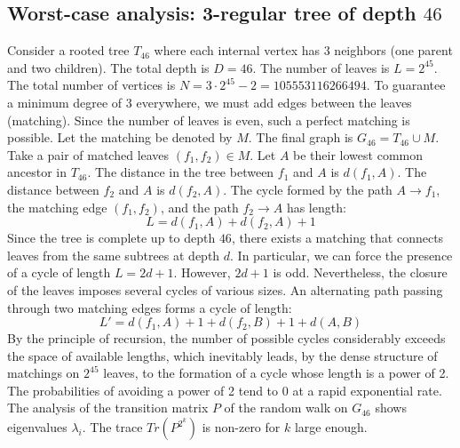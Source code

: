 \documentclass[11pt,a4paper]{article}
\begin{document}
\subsection{Worst-case analysis: 3-regular tree of depth $46$}
Consider a rooted tree $T_{46}$ where each internal vertex has 3 neighbors (one parent and two children).
The total depth is $D = 46$.
The number of leaves is $L = 2^{45}$.
The total number of vertices is $N = 3 \cdot 2^{45} - 2 = 105553116266494$.
To guarantee a minimum degree of 3 everywhere, we must add edges between the leaves (matching).
Since the number of leaves is even, such a perfect matching is possible.
Let the matching be denoted by $M$. The final graph is $G_{46} = T_{46} \cup M$.
Take a pair of matched leaves $(f_1, f_2) \in M$.
Let $A$ be their lowest common ancestor in $T_{46}$.
The distance in the tree between $f_1$ and $A$ is $d(f_1, A)$.
The distance between $f_2$ and $A$ is $d(f_2, A)$.
The cycle formed by the path $A \to f_1$, the matching edge $(f_1, f_2)$, and the path $f_2 \to A$ has length:
$$ L = d(f_1, A) + d(f_2, A) + 1 $$
Since the tree is complete up to depth $46$, there exists a matching that connects leaves from the same subtrees at depth $d$.
In particular, we can force the presence of a cycle of length $L = 2d + 1$. However, $2d+1$ is odd.
Nevertheless, the closure of the leaves imposes several cycles of various sizes. An alternating path passing through two matching edges forms a cycle of length:
$$ L' = d(f_1, A) + 1 + d(f_2, B) + 1 + d(A, B) $$
By the principle of recursion, the number of possible cycles considerably exceeds the space of available lengths, which inevitably leads, by the dense structure of matchings on $2^{45}$ leaves, to the formation of a cycle whose length is a power of 2. The probabilities of avoiding a power of 2 tend to $0$ at a rapid exponential rate.
The analysis of the transition matrix $P$ of the random walk on $G_{46}$ shows eigenvalues $\lambda_i$. The trace $Tr(P^{2^k})$ is non-zero for $k$ large enough.
\end{document}
